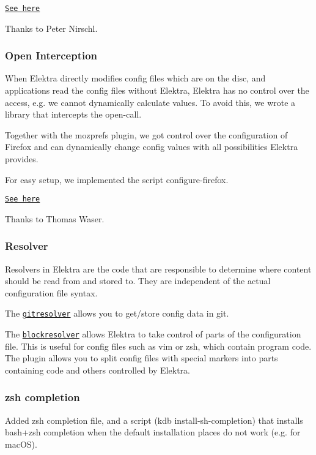 \href{https://git.libelektra.org/tree/master/src/plugins/crypto}{\tt See here}

Thanks to Peter Nirschl.

\subsubsection*{Open Interception}

When Elektra directly modifies config files which are on the disc, and applications read the config files without Elektra, Elektra has no control over the access, e.\+g. we cannot dynamically calculate values. To avoid this, we wrote a library that intercepts the {\ttfamily open}-\/call.

Together with the {\ttfamily mozprefs} plugin, we got control over the configuration of Firefox and can dynamically change config values with all possibilities Elektra provides.

For easy setup, we implemented the script {\ttfamily configure-\/firefox}.

\href{https://git.libelektra.org/tree/master/src/bindings/intercept}{\tt See here}

Thanks to Thomas Waser.

\subsubsection*{Resolver}

Resolvers in Elektra are the code that are responsible to determine where content should be read from and stored to. They are independent of the actual configuration file syntax.

The \href{https://git.libelektra.org/tree/master/src/plugins/gitresolver}{\tt gitresolver} allows you to get/store config data in git.

The \href{https://git.libelektra.org/tree/master/src/plugins/blockresolver}{\tt blockresolver} allows Elektra to take control of parts of the configuration file. This is useful for config files such as vim or zsh, which contain program code. The plugin allows you to split config files with special markers into parts containing code and others controlled by Elektra.

\subsubsection*{zsh completion}

Added zsh completion file, and a script ({\ttfamily kdb install-\/sh-\/completion}) that installs bash+zsh completion when the default installation places do not work (e.\+g. for mac\+OS).

